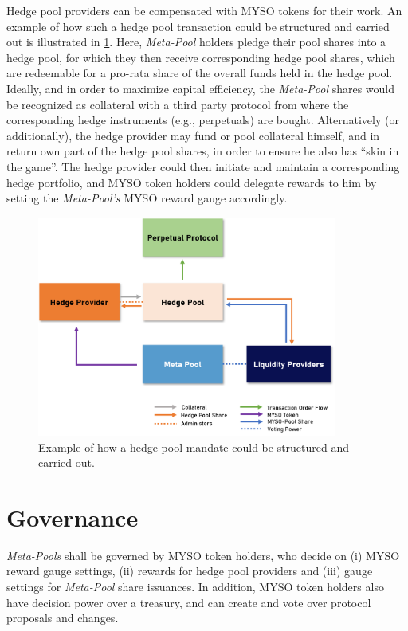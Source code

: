 \documentclass[a4paper]{article}
\begin{document}
Hedge pool providers can be compensated with MYSO tokens for their work. An example of how such a hedge pool transaction could be structured and carried out is illustrated in \cref{fig:hedge-pool}. Here, \emph{Meta-Pool} holders pledge their pool shares into a hedge pool, for which they then receive corresponding hedge pool shares, which are redeemable for a pro-rata share of the overall funds held in the hedge pool. Ideally, and in order to maximize capital efficiency, the \emph{Meta-Pool} shares would be recognized as collateral with a third party protocol from where the corresponding hedge instruments (e.g., perpetuals) are bought. Alternatively (or additionally), the hedge provider may fund or pool collateral himself, and in return own part of the hedge pool shares, in order to ensure he also has ``skin in the game''. The hedge provider could then initiate and maintain a corresponding hedge portfolio, and MYSO token holders could delegate rewards to him by setting the \emph{Meta-Pool's} MYSO reward gauge accordingly.
\begin{figure}
    \centering
    \includegraphics[width=0.88\textwidth]{figures/hedge-pool.png} 
    \cprotect\caption{\small Example of how a hedge pool mandate could be structured and carried out.}
    \label{fig:hedge-pool}
\end{figure}


\section{Governance}
\label{sec:governance}
\emph{Meta-Pools} shall be governed by MYSO token holders, who decide on (i) MYSO reward gauge settings, (ii) rewards for hedge pool providers and (iii) gauge settings for \emph{Meta-Pool} share issuances. In addition, MYSO token holders also have decision power over a treasury, and can create and vote over protocol proposals and changes.
\end{document}
